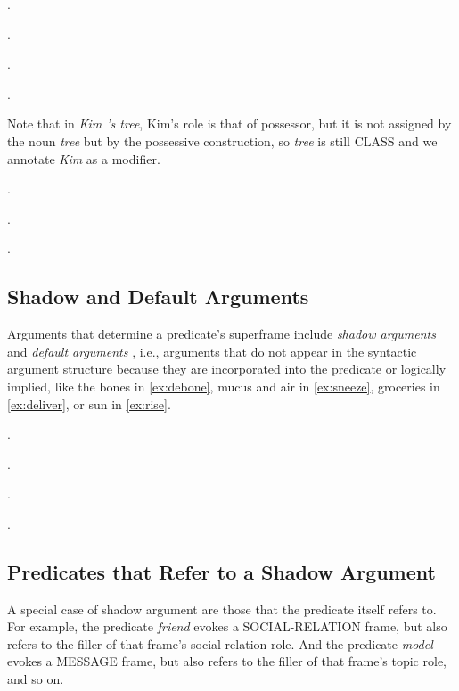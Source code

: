 \documentclass[a4paper]{article}
\newcommand{\fr}[1]{\textsf{#1}}
\newcommand{\rl}[1]{\textsf{#1}}
\begin{document}
\ex.

\ex.

\ex.

\ex.

Note that in \emph{Kim 's tree}, Kim's role is that of \rl{possessor}, but it
is not assigned by the noun \emph{tree} but by the possessive construction, so
\emph{tree} is still \fr{CLASS} and we annotate \emph{Kim} as a modifier.

\ex.

\ex.

\ex.


\newpage\subsection{Shadow and Default Arguments}

Arguments that determine a predicate's superframe include \emph{shadow
arguments} and \emph{default arguments}
\citep{pustejovsky-1995-generative,di-fabio-etal-2019-verbatlas}, i.e.,
arguments that do not appear in the syntactic argument structure because they
are incorporated into the predicate or logically implied, like the bones in
\ref{ex:debone}, mucus and air in \ref{ex:sneeze}, groceries in
\ref{ex:deliver}, or sun in \ref{ex:rise}.

\ex.\label{ex:debone}

\ex.\label{ex:sneeze}

\ex.\label{ex:deliver}

\ex.\label{ex:rise}


\newpage\subsection{Predicates that Refer to a Shadow Argument}

A special case of shadow argument are those that the predicate itself refers
to. For example, the predicate \emph{friend} evokes a \fr{SOCIAL-RELATION}
frame, but also refers to the filler of that frame's \rl{social-relation} role.
And the predicate \emph{model} evokes a \fr{MESSAGE} frame, but also refers to
the filler of that frame's \rl{topic} role, and so on.
\end{document}
